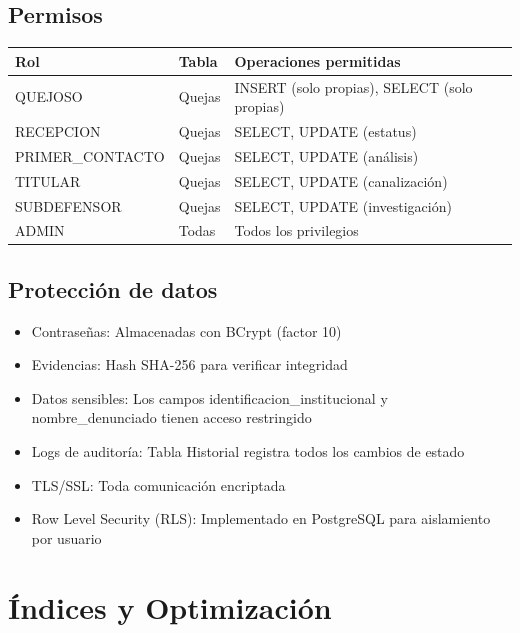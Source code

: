\documentclass[11pt,letterpaper]{article}
\begin{document}
\subsection{Permisos}
\begin{longtable}{|p{4cm}|p{3.5cm}|p{6cm}|}
\hline
\rowcolor{lightgray} \textbf{Rol} & \textbf{Tabla} & \textbf{Operaciones permitidas} \\
\hline
QUEJOSO & Quejas & INSERT (solo propias), SELECT (solo propias) \\
\hline
RECEPCION & Quejas & SELECT, UPDATE (estatus) \\
\hline
PRIMER\_CONTACTO & Quejas & SELECT, UPDATE (análisis) \\
\hline
TITULAR & Quejas & SELECT, UPDATE (canalización) \\
\hline
SUBDEFENSOR & Quejas & SELECT, UPDATE (investigación) \\
\hline
ADMIN & Todas & Todos los privilegios \\
\hline
\end{longtable}

\subsection{Protección de datos}
\begin{itemize}
\item Contraseñas: Almacenadas con BCrypt (factor 10)
\item Evidencias: Hash SHA-256 para verificar integridad
\item Datos sensibles: Los campos identificacion\_institucional y nombre\_denunciado tienen acceso restringido
\item Logs de auditoría: Tabla Historial registra todos los cambios de estado
\item TLS/SSL: Toda comunicación encriptada
\item Row Level Security (RLS): Implementado en PostgreSQL para aislamiento por usuario
\end{itemize}

\section{Índices y Optimización}
\end{document}
